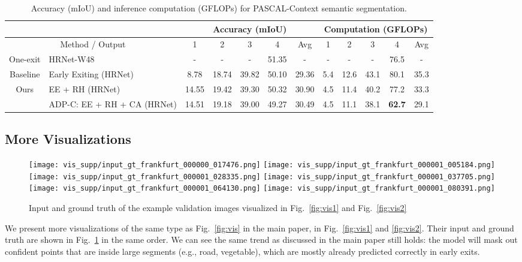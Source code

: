 \setlength{\tabcolsep}{2pt}
\renewcommand{\arraystretch}{1.2}
\begin{table}[h]
\centering
\footnotesize
\begin{tabular}{c|l|ccccc|ccccc}
\hline
\multicolumn{2}{c|}{}                              & \multicolumn{5}{c}{Accuracy (mIoU)}         & \multicolumn{5}{|c}{Computation (GFLOPs)}            \\ \hline
\multicolumn{2}{c|}{Method / Output}               & 1    & 2    & 3    & 4    & Avg  & 1     & 2     & 3     & 4      & Avg   \\ \hline
 One-exit & HRNet-W48 \cite{wang2020deep}          & -    & -    & -    & 51.35 & -    & -     & -     & -     & 76.5  & -     \\ \hline
\multirow{1}{*}{Baseline} & Early Exiting (HRNet) & 8.78 & 18.74 & 39.82 & 50.10 & 29.36 & 5.4  &12.6 & 43.1 & 80.1  & 35.3 \\
                           \hline
\multirow{2}{*}{Ours}      
                           & EE + RH (HRNet)      & 14.55 & 19.42 & 39.30 & 50.32 & 30.90 & 4.5 & 11.4  & 40.2 & 77.2  & 33.3 \\
                           & ADP-C: EE + RH + CA (HRNet) & 14.51 & 19.18 & 39.00 & 49.27 & 30.49 & 4.5 & 11.1  & 38.1 & \textbf{62.7}  & 29.1 \\ \hline
\end{tabular}
\caption{%
Accuracy (mIoU) and inference computation (GFLOPs) for PASCAL-Context semantic segmentation. 
}
\label{tab:pascal}
\end{table}


\subsection{More Visualizations}
\label{app:vis}

\begin{figure}[H]
\texttt{[image: vis\_supp/input\_gt\_frankfurt\_000000\_017476.png]}
\texttt{[image: vis\_supp/input\_gt\_frankfurt\_000001\_005184.png]}
\texttt{[image: vis\_supp/input\_gt\_frankfurt\_000001\_028335.png]}
\texttt{[image: vis\_supp/input\_gt\_frankfurt\_000001\_037705.png]}
\texttt{[image: vis\_supp/input\_gt\_frankfurt\_000001\_064130.png]}
\texttt{[image: vis\_supp/input\_gt\_frankfurt\_000001\_080391.png]}
\caption{Input and ground truth of the example validation images visualized in Fig.~\ref{fig:vis1} and Fig.~\ref{fig:vis2}}
\label{fig:gt}
\end{figure}
We present more visualizations of the same type as Fig.~\ref{fig:vis} in the main paper, in Fig.~\ref{fig:vis1} and \ref{fig:vis2}. Their input and ground truth are shown in Fig.~\ref{fig:gt} in the same order. We can see the same trend as discussed in the main paper still holds: the model will mask out confident points that are inside large segments (e.g., road, vegetable), which are mostly already predicted correctly in early exits.

